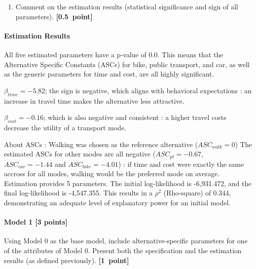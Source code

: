 \documentclass[11pt,a4paper]{article}
\begin{document}
\begin{enumerate}
	\item Comment on the estimation results (statistical significance and sign of all parameters). \textbf{[0.5~point]}
\end{enumerate}


\paragraph{Estimation Results}
\begin{description}
All five estimated parameters have a p-value of 0.0. This means that the Alternative Specific Constants (ASCs) for bike, public transport, and car, as well as the generic parameters for time and cost, are all highly significant. 
\end{description}

\begin{description}
    \item $\beta_{time} = -5.82$; the sign is negative, which aligns with behavioral expectations : an increase in travel time makes the alternative less attractive. 
    \item $\beta_{cost} = -0.16$; which is also negative and  consistent : a higher travel costs decrease the utility of a transport mode. 
\end{description}

\begin{enumerate}
About ASCs : 
Walking was chosen as the reference alternative ($ASC_{walk} = 0$)  
The estimated ASCs for other modes are all negative ($ASC_{pt} = -0.67$, $ASC_{car} = -1.44$ and 
$ASC_{bike} = -4.01$) : if time and cost were exactly the same accross for all modes, walking would be the preferred mode on average. Estimation provides 5 parameters. The initial log-likelihood is -6,931.472, and the final log-likelihood is -4,547.355. This results in a $\rho^2$ (Rho-square) of 0.344, demonstrating an adequate level of explanatory power for an initial model.
\end{enumerate}


\paragraph{Model 1 [3 points]} Using Model 0 as the base model, include alternative-specific parameters for one of the attributes of Model 0. Present both the specification and the estimation results (as defined previously). \textbf{[1~point]}\\
\end{document}
